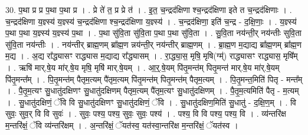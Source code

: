 \documentclass[17pt]{extarticle}
\begin{document}
30. प॒था प्र प्र प॒था प॒था प्र । . प्रे ते॑ त॒ प्र प्रे त॑ । . इ॒त॒ च॒न्द्रद॑क्षिणा श्च॒न्द्रद॑क्षिणा इते त च॒न्द्रद॑क्षिणाः । . च॒न्द्रद॑क्षिणा य॒ज्ञ्स्य॑ य॒ज्ञ्स्य॑ च॒न्द्रद॑क्षिणा श्च॒न्द्रद॑क्षिणा य॒ज्ञ्स्य॑ । . च॒न्द्रद॑क्षिणा॒ इति॑ च॒न्द्र - द॒क्षि॒णाः॒ । . य॒ज्ञ्स्य॑ प॒था प॒था य॒ज्ञ्स्य॑ य॒ज्ञ्स्य॑ प॒था । . प॒था सु॑वि॒ता सु॑वि॒ता प॒था प॒था सु॑वि॒ता । . सु॒वि॒ता नय॑न्ती॒र् नय॑न्तीः सुवि॒ता सु॑वि॒ता नय॑न्तीः । . नय॑न्तीर् ब्राह्म॒णम् ब्रा᳚ह्म॒ण न्नय॑न्ती॒र् नय॑न्तीर् ब्राह्म॒णम् । . ब्रा॒ह्म॒ण म॒द्याद्य ब्रा᳚ह्म॒णम् ब्रा᳚ह्म॒ण म॒द्य । . अ॒द्य रा᳚द्ध्यासꣳ राद्ध्यास म॒द्याद्य रा᳚द्ध्यासम् । . रा॒द्ध्या॒स॒ मृषि॒ मृषि(ग्म्॑) राद्ध्यासꣳ राद्ध्यास॒ मृषि᳚म् । . ऋषि॑ मार्.षे॒य मा॑र्.षे॒य मृषि॒ मृषि॑ मार्.षे॒यम् । . आ॒र्॒.षे॒यम् पि॑तृ॒मन्त॑म् पितृ॒मन्त॑ मार्.षे॒य मा॑र्.षे॒यम् पि॑तृ॒मन्त᳚म् । . पि॒तृ॒मन्त॑म् पैतृम॒त्यम् पै॑तृम॒त्यम् पि॑तृ॒मन्त॑म् पितृ॒मन्त॑म् पैतृम॒त्यम् । . पि॒तृ॒मन्त॒मिति॑ पितृ - मन्त᳚म् । . पै॒तृ॒म॒त्यꣳ सु॒धातु॑दक्षिणꣳ सु॒धातु॑दक्षिणम् पैतृम॒त्यम् पै॑तृम॒त्यꣳ सु॒धातु॑दक्षिणम् । . पै॒तृ॒म॒त्यमिति॑ पैतृ - म॒त्यम् । . सु॒धातु॑दक्षिणं॒ ॅवि वि सु॒धातु॑दक्षिणꣳ सु॒धातु॑दक्षिणं॒ ॅवि । . सु॒धातु॑दक्षिण॒मिति॑ सु॒धातु॑ - द॒क्षि॒ण॒म् । . वि सुवः॒ सुव॒र् वि वि सुवः॑ । . सुवः॒ पश्य॒ पश्य॒ सुवः॒ सुवः॒ पश्य॑ । . पश्य॒ वि वि पश्य॒ पश्य॒ वि । . व्य॑न्तरि॑क्ष म॒न्तरि॑क्षं॒ ॅवि व्य॑न्तरि॑क्षम् । . अ॒न्तरि॑क्षं॒ ॅयत॑स्व॒ यत॑स्वा॒न्तरि॑क्ष म॒न्तरि॑क्षं॒ ॅयत॑स्व । \newline
\end{document}
